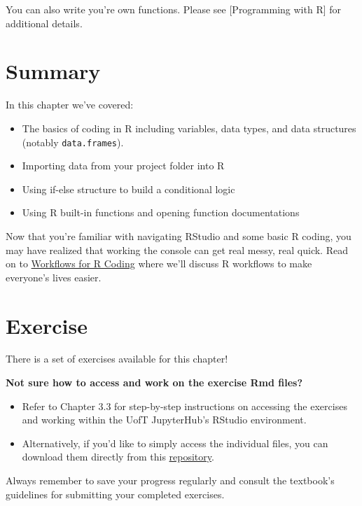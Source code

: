 \documentclass[
]{book}
\providecommand{\tightlist}{%
  \setlength{\itemsep}{0pt}\setlength{\parskip}{0pt}}
\begin{document}
You can also write you're own functions. Please see {[}Programming with R{]} for additional details.

\hypertarget{summary-2}{%
\section{Summary}\label{summary-2}}

In this chapter we've covered:

\begin{itemize}
\tightlist
\item
  The basics of coding in R including variables, data types, and data structures (notably \texttt{data.frames}).
\item
  Importing data from your project folder into R
\item
  Using if-else structure to build a conditional logic
\item
  Using R built-in functions and opening function documentations
\end{itemize}

Now that you're familiar with navigating RStudio and some basic R coding, you may have realized that working the console can get real messy, real quick. Read on to \protect\hyperlink{workflows-for-r-coding}{Workflows for R Coding} where we'll discuss R workflows to make everyone's lives easier.

\hypertarget{exercise-2}{%
\section{Exercise}\label{exercise-2}}

There is a set of exercises available for this chapter!

\textbf{Not sure how to access and work on the exercise Rmd files? }

\begin{itemize}
\item
  Refer to Chapter 3.3 for step-by-step instructions on accessing the exercises and working within the UofT JupyterHub's RStudio environment.
\item
  Alternatively, if you'd like to simply access the individual files, you can download them directly from this \href{https://github.com/UofTChem-Teaching/R4EnvChem-Exercises}{repository}.
\end{itemize}

Always remember to save your progress regularly and consult the textbook's guidelines for submitting your completed exercises.
\end{document}
